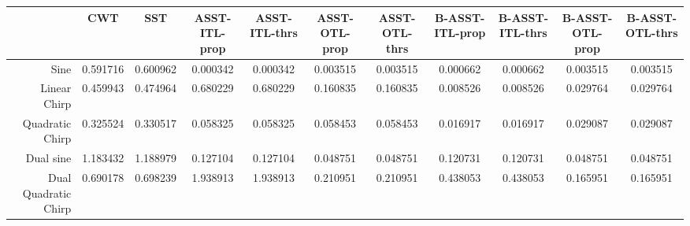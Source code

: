 \begin{tabular}{|r|c|c|c|c|c|c|c|c|c|c|}
\toprule
 & CWT & SST & ASST-ITL-prop & ASST-ITL-thrs & ASST-OTL-prop & ASST-OTL-thrs & B-ASST-ITL-prop & B-ASST-ITL-thrs & B-ASST-OTL-prop & B-ASST-OTL-thrs \\
\midrule
Sine & 0.591716 & 0.600962 & 0.000342 & 0.000342 & 0.003515 & 0.003515 & 0.000662 & 0.000662 & 0.003515 & 0.003515 \\
Linear Chirp & 0.459943 & 0.474964 & 0.680229 & 0.680229 & 0.160835 & 0.160835 & 0.008526 & 0.008526 & 0.029764 & 0.029764 \\
Quadratic Chirp & 0.325524 & 0.330517 & 0.058325 & 0.058325 & 0.058453 & 0.058453 & 0.016917 & 0.016917 & 0.029087 & 0.029087 \\
Dual sine & 1.183432 & 1.188979 & 0.127104 & 0.127104 & 0.048751 & 0.048751 & 0.120731 & 0.120731 & 0.048751 & 0.048751 \\
Dual Quadratic Chirp & 0.690178 & 0.698239 & 1.938913 & 1.938913 & 0.210951 & 0.210951 & 0.438053 & 0.438053 & 0.165951 & 0.165951 \\
\bottomrule
\end{tabular}
